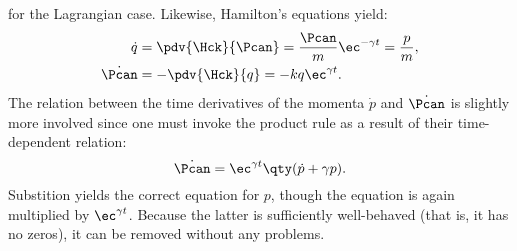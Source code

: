 for the Lagrangian case. Likewise, Hamilton's equations yield: \cite{Tokieda2021}
\begin{equation*}
    \begin{split}
        \dot{q} &= \pdv{\Hck}{\Pcan} = \frac{\Pcan}{m}\ec^{-\gamma t} =  \frac{p}{m}, \\
        \dot{\Pcan} &= -\pdv{\Hck}{q} = -kq\ec^{\gamma t}.\\
    \end{split}
\end{equation*}
The relation between the time derivatives of the momenta $\dot{p}$ and $\dot{\Pcan}$ is slightly more involved since one must invoke the product rule as a result of their time-dependent relation:
\begin{equation}
    \dot{\Pcan} = \ec^{\gamma t}\qty(\dot{p} + \gamma p).  
    \label{eq:momentum_relation}
\end{equation}
Substition yields the correct equation for $p$, though the equation is again multiplied by $\ec^{\gamma t}$. Because the latter is sufficiently well-behaved (that is, it has no zeros), it can be removed without any problems.

